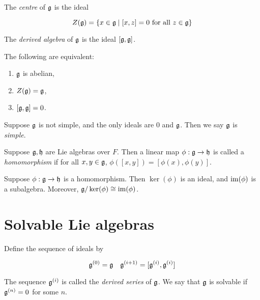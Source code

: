 \documentclass{article}
\begin{document}
\begin{definition}
    [centre] The \emph{centre} of \(\mathfrak{g}\) is the ideal

    \[Z(\mathfrak{g}) = \{x \in \mathfrak{g} \mid [x, z] = 0 \text{ for all }z \in \mathfrak{g}\}\]
\end{definition}

\begin{definition}
     The \emph{derived algebra} of \(\mathfrak{g}\) is the ideal \([\mathfrak{g}, \mathfrak{g}]\).
\end{definition}

\begin{proposition}
    The following are equivalent:

    \begin{enumerate}
        \item \(\mathfrak{g}\) is abelian,
        \item \(Z(\mathfrak{g}) = \mathfrak{g}\),
        \item \([\mathfrak{g}, \mathfrak{g}] = 0\).
    \end{enumerate}
\end{proposition}

\begin{definition}
    [simple] Suppose \(\mathfrak{g}\) is not simple, and the only ideals are \(0\) and \(\mathfrak{g}\). Then we say \(\mathfrak{g}\) is \emph{simple}.
\end{definition}

\begin{definition}
    [homomorphism] Suppose \(\mathfrak{g}, \mathfrak{h}\) are Lie algebras over \(F\). Then a linear map \(\phi : \mathfrak{g} \to \mathfrak{h}\) is called a \emph{homomorphism} if for all \(x, y \in \mathfrak{g}\), \(\phi([x, y]) = [\phi(x), \phi(y)]\).
\end{definition}

\begin{proposition}
    Suppose \(\phi : \mathfrak{g} \to \mathfrak{h}\) is a homomorphism. Then \(\ker(\phi)\) is an ideal, and \(\operatorname{im}(\phi)\) is a subalgebra. Moreover, \(\mathfrak{g}/\ker(\phi) \cong \operatorname{im}(\phi)\).
\end{proposition}

\section{Solvable Lie algebras}

\begin{definition}
     Define the sequence of ideals by

    \[\mathfrak{g}^{(0)} = \mathfrak{g} \quad \mathfrak{g}^{(i+1)} = [\mathfrak{g}^{(i)}, \mathfrak{g}^{(i)}]\]

    The sequence \(\mathfrak{g}^{(i)}\) is called the \emph{derived series} of \(\mathfrak{g}\). We say that \(\mathfrak{g}\) is solvable if \(\mathfrak{g}^{(n)} = 0\) for some \(n\). 
\end{definition}
\end{document}
